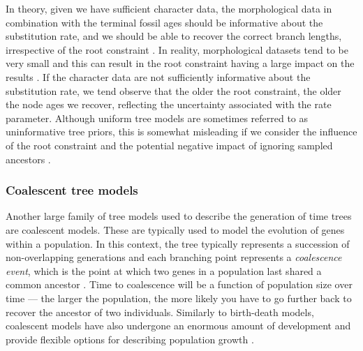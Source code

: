 \documentclass[11pt]{article}
\newcommand{\aw}[1]{{\textcolor{armygreen}{[AW: #1]}}} %
\begin{document}
In theory, given we have sufficient character data, the morphological %
data in combination with the terminal fossil ages should be informative about the substitution rate, and we should be able to recover the correct branch lengths, irrespective of the root constraint \cite{Ronquist2012a,Klopfstein2019}.
In reality, morphological datasets tend to be very small and this can result in the root constraint having a large impact on the results \cite{matzke2016}.
If the character data are not sufficiently informative about the substitution rate, we tend observe that the older the root constraint, the older the node ages we recover, reflecting the uncertainty associated with the rate parameter.
Although uniform tree models are sometimes referred to as uninformative tree priors, this is somewhat misleading if we consider the influence of the root constraint and the potential negative impact of ignoring sampled ancestors \cite{Gavryushkina2014}.

\subsubsection{Coalescent tree models}
Another large family of tree models used to describe the generation of time trees are coalescent models. These are typically used to model the evolution of genes within a population. 
In this context, the tree typically represents a succession of non-overlapping generations and each branching point represents a \textit{coalescence event}, which is the point at which two genes in a population last shared a common ancestor \cite{Kingman1982}.
Time to coalescence will be a function of population size over time --- the larger the population, the more likely you have to go further back to recover the ancestor of two individuals. %
Similarly to birth-death models, coalescent models have also undergone an enormous amount of development and provide flexible options for describing population growth \cite{Beerli2001, Drummond2005, Mashayekhi2019}. %
\end{document}
